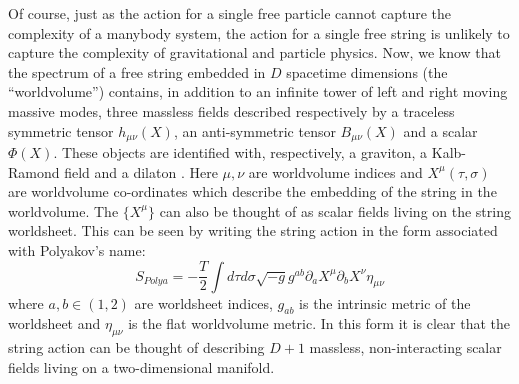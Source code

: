 \documentclass[submission, Phys]{SciPost}
\begin{document}
Of course, just as the action for a single free particle cannot capture the complexity of a manybody system, the action for a single free string is unlikely to capture the complexity of gravitational and particle physics. Now, we know that the spectrum of a free string embedded in $ D $ spacetime dimensions (the ``worldvolume'') contains, in addition to an infinite tower of left and right moving massive modes, three massless fields described respectively by a traceless symmetric tensor $ h_{\mu\nu}(X) $, an anti-symmetric tensor $ B_{\mu\nu}(X) $ and a scalar $ \Phi(X) $. These objects are identified with, respectively, a graviton, a Kalb-Ramond field and a dilaton \cite[Sec 2.3.2]{Tong2010Lectures}. Here $ \mu, \nu $ are worldvolume indices and $ X^{\mu}(\tau,\sigma) $ are worldvolume co-ordinates which describe the embedding of the string in the worldvolume. The $ \{X^\mu\} $ can also be thought of as scalar fields living on the string worldsheet. This can be seen by writing the string action in the form associated with Polyakov's name:
\begin{equation}\label{eqn:polyakov-flat}
	S_{Polya} = -\frac{T}{2} \int d\tau d\sigma \sqrt{-g} g^{ab} \partial_a X^\mu \partial_b X^\nu \eta_{\mu\nu}
\end{equation}
where $ a,b \in (1,2) $ are worldsheet indices, $ g_{ab} $ is the intrinsic metric of the worldsheet and $ \eta_{\mu\nu} $ is the flat worldvolume metric. In this form it is clear that the string action can be thought of describing $ D+1 $ massless, non-interacting scalar fields living on a two-dimensional manifold.
\end{document}

